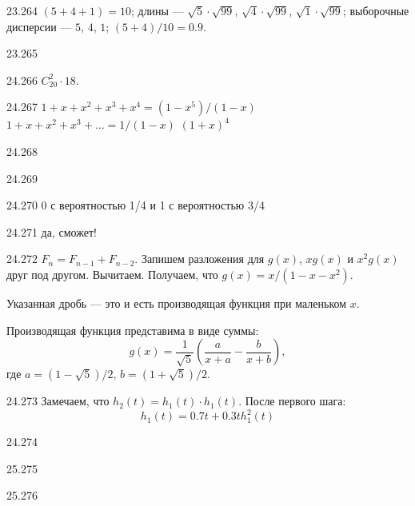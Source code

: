 \protect \hypertarget {soln:23.264}{}
\begin{solution}{{23.264}}
$(5+4+1)=10$; длины — $\sqrt{5}\cdot\sqrt{99}$, $\sqrt{4}\cdot\sqrt{99}$, $\sqrt{1}\cdot\sqrt{99}$; выборочные дисперсии — $5$, $4$, $1$; $(5+4)/10=0.9$.
\end{solution}
\protect \hypertarget {soln:23.265}{}
\begin{solution}{{23.265}}
\end{solution}
\protect \hypertarget {soln:24.266}{}
\begin{solution}{{24.266}}
$C_{20}^2\cdot 18$.
\end{solution}
\protect \hypertarget {soln:24.267}{}
\begin{solution}{{24.267}}
  $1+x+x^2+x^3+x^4=(1-x^5)/(1-x)$
  $1+x+x^2+x^3+\ldots = 1/(1-x)$
  $(1+x)^4$
\end{solution}
\protect \hypertarget {soln:24.268}{}
\begin{solution}{{24.268}}
\end{solution}
\protect \hypertarget {soln:24.269}{}
\begin{solution}{{24.269}}
\end{solution}
\protect \hypertarget {soln:24.270}{}
\begin{solution}{{24.270}}
  0 с вероятностью 1/4 и 1 с вероятностью 3/4
\end{solution}
\protect \hypertarget {soln:24.271}{}
\begin{solution}{{24.271}}
  да, сможет!
\end{solution}
\protect \hypertarget {soln:24.272}{}
\begin{solution}{{24.272}}
$F_n = F_{n-1} + F_{n-2}$.
Запишем разложения для $g(x)$, $xg(x)$ и $x^2 g(x)$ друг под другом. Вычитаем. Получаем, что $g(x) = x/(1-x-x^2)$.

Указанная дробь — это и есть производящая функция при маленьком $x$.

Производящая функция представима в виде суммы:
\[
g(x) = \frac{1}{\sqrt{5}}\left( \frac{a}{x+a} - \frac{b}{x+b}  \right),
\]
где $a=(1-\sqrt{5})/2$, $b=(1+\sqrt{5})/2$.
\end{solution}
\protect \hypertarget {soln:24.273}{}
\begin{solution}{{24.273}}
Замечаем, что $h_2(t)=h_1(t)\cdot h_1(t)$. После первого шага:
\[
h_1(t) = 0.7t + 0.3th^2_1(t)
\]
\end{solution}
\protect \hypertarget {soln:24.274}{}
\begin{solution}{{24.274}}

\end{solution}
\protect \hypertarget {soln:25.275}{}
\begin{solution}{{25.275}}
\end{solution}
\protect \hypertarget {soln:25.276}{}
\begin{solution}{{25.276}}
\end{solution}
